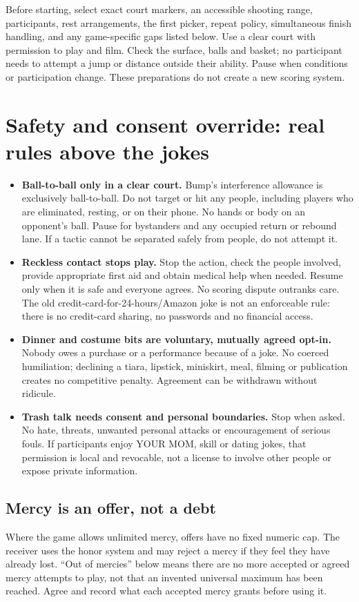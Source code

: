 \documentclass[11pt]{article}
\begin{document}
Before starting, select exact court markers, an accessible shooting range,
participants, rest arrangements, the first picker, repeat policy, simultaneous
finish handling, and any game-specific gaps listed below. Use a clear court with
permission to play and film. Check the surface, balls and basket; no participant
needs to attempt a jump or distance outside their ability. Pause when conditions
or participation change. These preparations do not create a new scoring system.

\section{Safety and consent override: real rules above the jokes}
\begin{itemize}
\item \textbf{Ball-to-ball only in a clear court.} Bump's interference allowance
is exclusively ball-to-ball. Do not target or hit any people, including players
who are eliminated, resting, or on their phone. No hands or body on an opponent's
ball. Pause for bystanders and any occupied return or rebound lane. If a tactic
cannot be separated safely from people, do not attempt it.
\item \textbf{Reckless contact stops play.} Stop the action, check the people
involved, provide appropriate first aid and obtain medical help when needed.
Resume only when it is safe and everyone agrees. No scoring dispute outranks
care. The old credit-card-for-24-hours/Amazon joke is not an enforceable rule:
there is no credit-card sharing, no passwords and no financial access.
\item \textbf{Dinner and costume bits are voluntary, mutually agreed opt-in.}
Nobody owes a purchase or a performance because of a joke. No coerced humiliation;
declining a tiara, lipstick, miniskirt, meal, filming or publication creates no
competitive penalty. Agreement can be withdrawn without ridicule.
\item \textbf{Trash talk needs consent and personal boundaries.} Stop when asked.
No hate, threats, unwanted personal attacks or encouragement of serious fouls.
If participants enjoy YOUR MOM, skill or dating jokes, that permission is local
and revocable, not a license to involve other people or expose private information.
\end{itemize}

\subsection{Mercy is an offer, not a debt}
Where the game allows unlimited mercy, offers have no fixed numeric cap. The
receiver uses the honor system and may reject a mercy if they feel they have
already lost. ``Out of mercies'' below means there are no more accepted or agreed
mercy attempts to play, not that an invented universal maximum has been reached.
Agree and record what each accepted mercy grants before using it.
\end{document}
